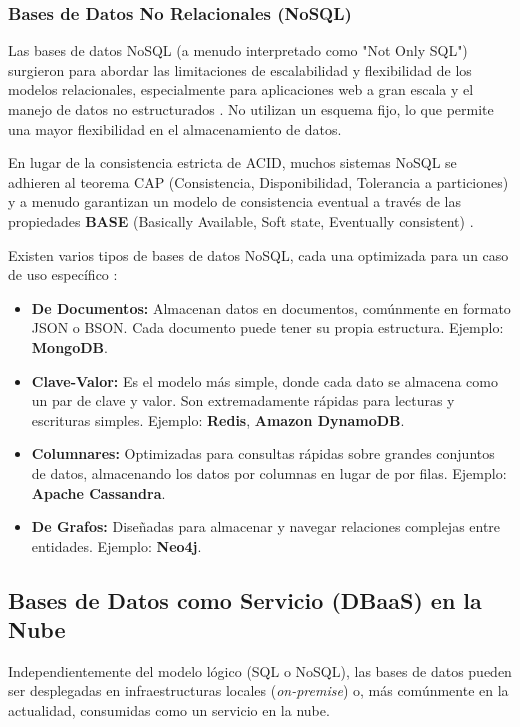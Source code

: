 \subsubsection{Bases de Datos No Relacionales (NoSQL)}
Las bases de datos NoSQL (a menudo interpretado como "Not Only SQL") surgieron para abordar las limitaciones de escalabilidad y flexibilidad de los modelos relacionales, especialmente para aplicaciones web a gran escala y el manejo de datos no estructurados \cite{aws2024nosql}. No utilizan un esquema fijo, lo que permite una mayor flexibilidad en el almacenamiento de datos.

En lugar de la consistencia estricta de ACID, muchos sistemas NoSQL se adhieren al teorema CAP (Consistencia, Disponibilidad, Tolerancia a particiones) y a menudo garantizan un modelo de consistencia eventual a través de las propiedades \textbf{BASE} (Basically Available, Soft state, Eventually consistent) \cite{mongodb2024sqlvsnosql}.

Existen varios tipos de bases de datos NoSQL, cada una optimizada para un caso de uso específico \cite{aws2024nosql}:
\begin{itemize}
    \item \textbf{De Documentos:} Almacenan datos en documentos, comúnmente en formato JSON o BSON. Cada documento puede tener su propia estructura. Ejemplo: \textbf{MongoDB}.
    \item \textbf{Clave-Valor:} Es el modelo más simple, donde cada dato se almacena como un par de clave y valor. Son extremadamente rápidas para lecturas y escrituras simples. Ejemplo: \textbf{Redis}, \textbf{Amazon DynamoDB}.
    \item \textbf{Columnares:} Optimizadas para consultas rápidas sobre grandes conjuntos de datos, almacenando los datos por columnas en lugar de por filas. Ejemplo: \textbf{Apache Cassandra}.
    \item \textbf{De Grafos:} Diseñadas para almacenar y navegar relaciones complejas entre entidades. Ejemplo: \textbf{Neo4j}.
\end{itemize}

\subsection{Bases de Datos como Servicio (DBaaS) en la Nube}
\label{subsec:dbaas}

Independientemente del modelo lógico (SQL o NoSQL), las bases de datos pueden ser desplegadas en infraestructuras locales (\textit{on-premise}) o, más comúnmente en la actualidad, consumidas como un servicio en la nube.

